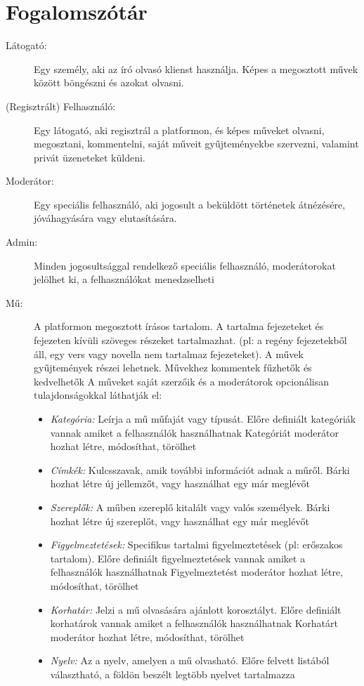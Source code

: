 \section{Fogalomszótár}

\begin{description}
\item [Látogató:] Egy személy, aki az író olvasó klienst használja. Képes a megosztott művek között böngészni és azokat olvasni.

\item [(Regisztrált) Felhasználó:] Egy látogató, aki regisztrál a platformon, és képes műveket olvasni, megosztani, kommentelni, saját műveit gyűjteményekbe szervezni, valamint privát üzeneteket küldeni.

\item [Moderátor:] Egy speciális felhasználó, aki jogosult a beküldött történetek átnézésére, jóváhagyására vagy elutasítására.

\item [Admin:] Minden jogosultsággal rendelkező speciális felhasználó, moderátorokat jelölhet ki, a felhasználókat menedzselheti

\item [Mű:] A platformon megosztott írásos tartalom. A tartalma fejezeteket és fejezeten kívüli szöveges részeket tartalmazhat. (pl: a regény fejezetekből áll, egy vers vagy novella nem tartalmaz fejezeteket).
A művek gyűjtemények részei lehetnek. Művekhez kommentek fűzhetők és kedvelhetők
A műveket saját szerzőik és a moderátorok opcionálisan tulajdonságokkal láthatják el:

\begin{itemize}
\item \emph{Kategória:} Leírja a mű műfaját vagy típusát.
Előre definiált kategóriák vannak amiket a felhasználók használhatnak
Kategóriát moderátor hozhat létre, módosíthat, törölhet
\item \emph{Címkék:} Kulcsszavak, amik további információt adnak a műről.
Bárki hozhat létre új jellemzőt, vagy használhat egy már meglévőt
\item \emph{Szereplők:} A műben szereplő kitalált vagy valós személyek.
Bárki hozhat létre új szereplőt, vagy használhat egy már meglévőt 
\item \emph{Figyelmeztetések:} Specifikus tartalmi figyelmeztetések (pl: erőszakos tartalom).
Előre definiált figyelmeztetések vannak amiket a felhasználók használhatnak
Figyelmeztetést moderátor hozhat létre, módosíthat, törölhet
\item \emph{Korhatár:} Jelzi a mű olvasására ajánlott korosztályt.
Előre definiált korhatárok vannak amiket a felhasználók használhatnak
Korhatárt moderátor hozhat létre, módosíthat, törölhet
\item \emph{Nyelv:} Az a nyelv, amelyen a mű olvasható.
Előre felvett listából választható, a földön beszélt legtöbb nyelvet tartalmazza
\end{itemize}


\end{description}
